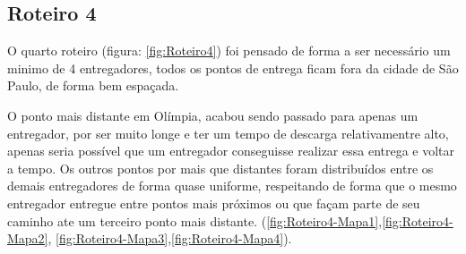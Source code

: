 \begin{center}
	\label{fig:Roteiro3-G1000P100-SwapMutation}
\end{center}


\subsection{Roteiro 4}

O quarto roteiro (figura: \ref{fig:Roteiro4}) foi pensado de forma a ser necessário um minimo de 4 entregadores, todos os pontos de entrega ficam fora da cidade de São Paulo, de forma bem espaçada.

O ponto mais distante em Olímpia, acabou sendo passado para apenas um entregador, por ser muito longe e ter um tempo de descarga relativamentre alto, apenas seria possível que um entregador conseguisse realizar essa entrega e voltar a tempo. Os outros pontos por mais que distantes foram distribuídos entre os demais entregadores de forma quase uniforme, respeitando de forma que o mesmo entregador entregue entre pontos mais próximos ou que façam parte de seu caminho ate um terceiro ponto mais distante. (\ref{fig:Roteiro4-Mapa1},\ref{fig:Roteiro4-Mapa2}, \ref{fig:Roteiro4-Mapa3},\ref{fig:Roteiro4-Mapa4}).

